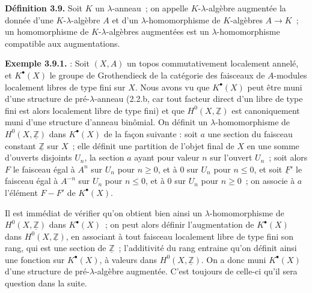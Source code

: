 \textbf{Définition 3.9.} Soit \(K\) un \(\lambda\)-anneau~; on appelle \(K\)-\(\lambda\)-algèbre augmentée la donnée d'une \(K\)-\(\lambda\)-algèbre \(A\) et d'un \(\lambda\)-homomorphisme de \(K\)-algèbres \(A\to K\)~; un homomorphisme de \(K\)-\(\lambda\)-algèbres augmentées est un \(\lambda\)-homomorphisme compatible aux augmentations.

\textbf{Exemple 3.9.1.} : Soit \((X,A)\) un topos commutativement localement annelé, et \(K^\bullet(X)\) le groupe de Grothendieck de la catégorie des faisceaux de \(A\)-modules localement libres de type fini sur \(X\). Nous avons vu que \(K^\bullet(X)\) peut être muni d'une structure de pré-\(\lambda\)-anneau (2.2.b, car tout facteur direct d'un libre de type fini est alors localement libre de type fini) et que \(H^0(X,\underline{\mathbb Z})\) est canoniquement muni d'une structure d'anneau binômial. On définit un \(\lambda\)-homomorphisme de \(H^0(X,\underline{\mathbb Z})\) dans \(K^\bullet(X)\) de la façon suivante : soit \(a\) une section du faisceau constant \(\underline{\mathbb Z}\) sur \(X\)~; elle définit une partition de l'objet final de \(X\) en une somme d'ouverts disjoints \(U_n\), la section \(a\) ayant pour valeur \(n\) sur l'ouvert \(U_n\)~; soit alors \(F\) le faisceau égal à \(A^n\) sur \(U_n\) pour \(n\ge0\), et à \(0\) sur \(U_n\) pour \(n\le0\), et soit \(\underline{F}'\) le faisceau égal à \(A^{-n}\) sur \(U_n\) pour \(n\le0\), et à \(0\) sur \(U_n\) pour \(n\ge0\)~; on associe à \(a\) l'élément \(F-F'\) de \(K^\bullet(X)\).

Il est immédiat de vérifier qu'on obtient bien ainsi un \(\lambda\)-homomorphisme de \(H^0(X,\underline{\mathbb Z})\) dans \(K^\bullet(X)\)~; on peut alors définir l'augmentation de \(K^\bullet(X)\) dans \(H^0(X,\underline{\mathbb Z})\), en associant à tout faisceau localement libre de type fini son rang, qui est une section de \(\underline{\mathbb Z}\)~; l'additivité du rang entraine qu'on définit ainsi une fonction sur \(K^\bullet(X)\), à valeurs dans \(H^0(X,\underline{\mathbb Z})\). On a donc muni \(K^\bullet(X)\) d'une structure de pré-\(\lambda\)-algèbre augmentée. C'est toujours de celle-ci qu'il sera question dans la suite.

